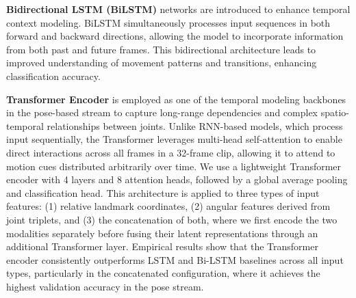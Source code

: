 \documentclass[journal,onecolumn, 11pt]{IEEEtran}
\begin{document}
\textbf{Bidirectional LSTM (BiLSTM)} networks are introduced to enhance temporal context modeling. BiLSTM simultaneously processes input sequences in both forward and backward directions, allowing the model to incorporate information from both past and future frames. This bidirectional architecture leads to improved understanding of movement patterns and transitions, enhancing classification accuracy.	\cite{graves2005}

\textbf{Transformer Encoder} is employed as one of the temporal modeling backbones in the pose-based stream to capture long-range dependencies and complex spatio-temporal relationships between joints. Unlike RNN-based models, which process input sequentially, the Transformer leverages multi-head self-attention to enable direct interactions across all frames in a 32-frame clip, allowing it to attend to motion cues distributed arbitrarily over time. We use a lightweight Transformer encoder with 4 layers and 8 attention heads, followed by a global average pooling and classification head. This architecture is applied to three types of input features: (1) relative landmark coordinates, (2) angular features derived from joint triplets, and (3) the concatenation of both, where we first encode the two modalities separately before fusing their latent representations through an additional Transformer layer. Empirical results show that the Transformer encoder consistently outperforms LSTM and Bi-LSTM baselines across all input types, particularly in the concatenated configuration, where it achieves the highest validation accuracy in the pose stream.\cite{plizzari2021sttr}


\end{document}
